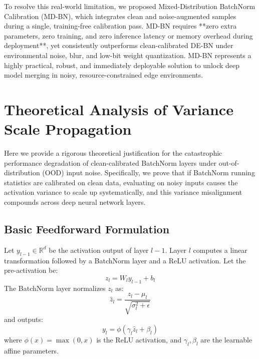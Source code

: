 \documentclass{article}
\theoremstyle{plain}
\theoremstyle{definition}
\theoremstyle{remark}
\begin{document}
To resolve this real-world limitation, we proposed Mixed-Distribution BatchNorm Calibration (MD-BN), which integrates clean and noise-augmented samples during a single, training-free calibration pass. MD-BN requires **zero extra parameters, zero training, and zero inference latency or memory overhead during deployment**, yet consistently outperforms clean-calibrated DE-BN under environmental noise, blur, and low-bit weight quantization. MD-BN represents a highly practical, robust, and immediately deployable solution to unlock deep model merging in noisy, resource-constrained edge environments.




\newpage
\appendix
\onecolumn

\section{Theoretical Analysis of Variance Scale Propagation}
\label{sec:appendix_theory}
Here we provide a rigorous theoretical justification for the catastrophic performance degradation of clean-calibrated BatchNorm layers under out-of-distribution (OOD) input noise. Specifically, we prove that if BatchNorm running statistics are calibrated on clean data, evaluating on noisy inputs causes the activation variance to scale up systematically, and this variance misalignment compounds across deep neural network layers.

\subsection{Basic Feedforward Formulation}
Let $y_{l-1} \in \mathbb{R}^d$ be the activation output of layer $l-1$. Layer $l$ computes a linear transformation followed by a BatchNorm layer and a ReLU activation.
Let the pre-activation be:
\begin{equation}
    z_l = W_l y_{l-1} + b_l
\end{equation}
The BatchNorm layer normalizes $z_l$ as:
\begin{equation}
    \hat{z}_l = \frac{z_l - \mu_l}{\sqrt{\sigma^2_l + \epsilon}}
\end{equation}
and outputs:
\begin{equation}
    y_l = \phi(\gamma_l \hat{z}_l + \beta_l)
\end{equation}
where $\phi(x) = \max(0, x)$ is the ReLU activation, and $\gamma_l, \beta_l$ are the learnable affine parameters.
\end{document}
